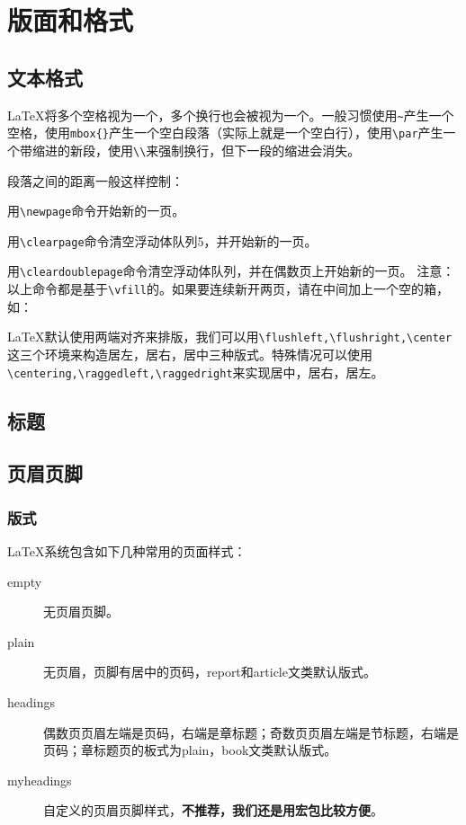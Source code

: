 \newpage
\chapter{版面和格式}
\thispagestyle{chapterpage}

\section{文本格式}

\LaTeX 将多个空格视为一个，多个换行也会被视为一个。一般习惯使用\lstinline|~|产生一个空格，使用\lstinline|mbox{}|产生一个空白段落（实际上就是一个空白行），使用\lstinline|\par|产生一个带缩进的新段，使用\lstinline|\\|来强制换行，但下一段的缩进会消失。

段落之间的距离一般这样控制：

\begin{latex}
\setlength{\parskip}{0pt plus 1pt}%
\end{latex}

用\lstinline|\newpage|命令开始新的一页。

用\lstinline|\clearpage|命令清空浮动体队列5，并开始新的一页。

用\lstinline|\cleardoublepage|命令清空浮动体队列，并在偶数页上开始新的一页。
注意：以上命令都是基于\lstinline|\vfill|的。如果要连续新开两页，请在中间加上一个空的箱，如：

\begin{latex}
\newpage\mbox{}\newpage
\end{latex}

\LaTeX 默认使用两端对齐来排版，我们可以用\lstinline|\flushleft,\flushright,\center|这三个环境来构造居左，居右，居中三种版式。特殊情况可以使用\lstinline|\centering,\raggedleft,\raggedright|来实现居中，居右，居左。

\section{标题}

\section{页眉页脚}
\subsection{版式}
\LaTeX{}系统包含如下几种常用的页面样式：
\label{plain}
\begin{description}
    \item[empty] 无页眉页脚。
    \item[plain] 无页眉，页脚有居中的页码，report和article文类默认版式。
    \item[headings] 偶数页页眉左端是页码，右端是章标题；奇数页页眉左端是节标题，右端是页码；章标题页的板式为plain，book文类默认版式。
    \item[myheadings] 自定义的页眉页脚样式，\textbf{不推荐，我们还是用宏包比较方便}。
\end{description}

